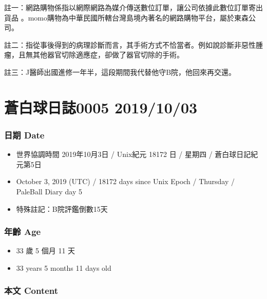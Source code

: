 \documentclass[
]{article}
\providecommand{\tightlist}{%
  \setlength{\itemsep}{0pt}\setlength{\parskip}{0pt}}
\begin{document}
註一：網路購物係指以網際網路為媒介傳送數位訂單，讓公司依據此數位訂單寄出貨品
。momo購物為中華民國所轄台灣島境內著名的網路購物平台，屬於東森公司。

註二：指從事後得到的病理診斷而言，其手術方式不恰當者。例如說診斷非惡性腫瘤，且無其他器官切除適應症，卻做了器官切除的手術。

註三：J醫師出國進修一年半，這段期間我代替他守B院，他回來再交還。

\hypertarget{ux84bcux767dux7403ux65e5ux8a8c0005-20191003}{%
\section{蒼白球日誌0005
2019/10/03}\label{ux84bcux767dux7403ux65e5ux8a8c0005-20191003}}

\hypertarget{ux65e5ux671f-date-4}{%
\subsubsection{日期 Date}\label{ux65e5ux671f-date-4}}

\begin{itemize}
\tightlist
\item
  世界協調時間 2019年10月3日 / Unix紀元 18172 日 / 星期四 /
  蒼白球日記紀元第5日
\item
  October 3, 2019 (UTC) / 18172 days since Unix Epoch / Thursday /
  PaleBall Diary day 5
\item
  特殊註記：B院評鑑倒數15天
\end{itemize}

\hypertarget{ux5e74ux9f61-age-4}{%
\subsubsection{年齡 Age}\label{ux5e74ux9f61-age-4}}

\begin{itemize}
\tightlist
\item
  33 歲 5 個月 11 天
\item
  33 years 5 months 11 days old
\end{itemize}

\hypertarget{ux672cux6587-content-4}{%
\subsubsection{本文 Content}\label{ux672cux6587-content-4}}
\end{document}
